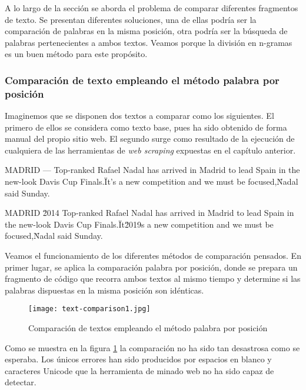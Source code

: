 A lo largo de la sección se aborda el problema de comparar diferentes fragmentos de texto. Se presentan
diferentes soluciones, una de ellas podría ser la comparación de palabras en la misma posición, otra podría
ser la búsqueda de palabras pertenecientes a ambos textos. Veamos porque la división en n-gramas es un
buen método para este propósito.

\subsubsection{Comparación de texto empleando el método palabra por posición}
\label{subsubsec:comparacion de textos empleando el metodo palabra por posicion}

Imaginemos que se disponen dos textos a comparar como los siguientes. El primero de ellos se considera como
texto base, pues ha sido obtenido de forma manual del propio sitio web. El segundo surge como resultado 
de la ejecución de cualquiera de las herramientas de \emph{web scraping} expuestas en el capítulo anterior.

\begin{Schunk}
  \begin{Soutput}
      MADRID — Top-ranked Rafael Nadal has arrived in Madrid to
      lead Spain in the new-look Davis Cup Finals.\n\n\"It’s a
      new competition and we must be focused,\" Nadal said Sunday.

      MADRID \u2014 Top-ranked Rafael Nadal has arrived in Madrid to 
      lead Spain in the new-look Davis Cup Finals.\"It\u2019s a 
      new competition and we must be focused,\" Nadal said Sunday.
  \end{Soutput}
\end{Schunk}

Veamos el funcionamiento de los diferentes métodos de comparación pensados. En primer lugar, se aplica la
comparación palabra por posición, donde se prepara un fragmento de código que recorra ambos textos al mismo
tiempo y determine si las palabras dispuestas en la misma posición son idénticas.

\begin{figure}[tphb]
  \centering
  \texttt{[image: text-comparison1.jpg]}
  \caption{Comparación de textos empleando el método palabra por posición}
  \label{img:comparacion de textos empleando el metodo palabra por posicion}
\end{figure}

Como se muestra en la figura \ref{img:comparacion de textos empleando el metodo palabra por posicion} la 
comparación no ha sido tan desastrosa como se esperaba. Los únicos errores han sido producidos por espacios 
en blanco y caracteres Unicode que la herramienta de minado web no ha sido capaz de detectar.

